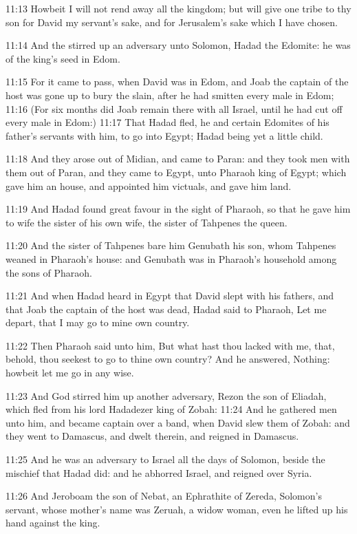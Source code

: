 11:13 Howbeit I will not rend away all the kingdom; but will give one
tribe to thy son for David my servant's sake, and for Jerusalem's sake
which I have chosen.

11:14 And the \LORD stirred up an adversary unto Solomon, Hadad the
Edomite: he was of the king's seed in Edom.

11:15 For it came to pass, when David was in Edom, and Joab the
captain of the host was gone up to bury the slain, after he had
smitten every male in Edom; 11:16 (For six months did Joab remain
there with all Israel, until he had cut off every male in Edom:) 11:17
That Hadad fled, he and certain Edomites of his father's servants with
him, to go into Egypt; Hadad being yet a little child.

11:18 And they arose out of Midian, and came to Paran: and they took
men with them out of Paran, and they came to Egypt, unto Pharaoh king
of Egypt; which gave him an house, and appointed him victuals, and
gave him land.

11:19 And Hadad found great favour in the sight of Pharaoh, so that he
gave him to wife the sister of his own wife, the sister of Tahpenes
the queen.

11:20 And the sister of Tahpenes bare him Genubath his son, whom
Tahpenes weaned in Pharaoh's house: and Genubath was in Pharaoh's
household among the sons of Pharaoh.

11:21 And when Hadad heard in Egypt that David slept with his fathers,
and that Joab the captain of the host was dead, Hadad said to Pharaoh,
Let me depart, that I may go to mine own country.

11:22 Then Pharaoh said unto him, But what hast thou lacked with me,
that, behold, thou seekest to go to thine own country? And he
answered, Nothing: howbeit let me go in any wise.

11:23 And God stirred him up another adversary, Rezon the son of
Eliadah, which fled from his lord Hadadezer king of Zobah: 11:24 And
he gathered men unto him, and became captain over a band, when David
slew them of Zobah: and they went to Damascus, and dwelt therein, and
reigned in Damascus.

11:25 And he was an adversary to Israel all the days of Solomon,
beside the mischief that Hadad did: and he abhorred Israel, and
reigned over Syria.

11:26 And Jeroboam the son of Nebat, an Ephrathite of Zereda,
Solomon's servant, whose mother's name was Zeruah, a widow woman, even
he lifted up his hand against the king.

